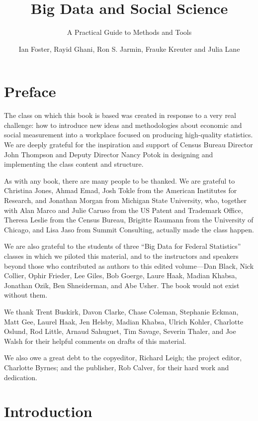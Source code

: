 \documentclass[]{krantz}
\title{Big Data and Social Science}
\subtitle{A Practical Guide to Methods and Tools}
\author{Ian Foster, Rayid Ghani, Ron S. Jarmin, Frauke Kreuter and Julia Lane}
\date{}
\begin{document}
\maketitle

{
\setcounter{tocdepth}{1}
\tableofcontents
}
\listoftables
\listoffigures
\chapter*{Preface}\label{preface}

The class on which this book is based was created in response to a very
real challenge: how to introduce new ideas and methodologies about
economic and social measurement into a workplace focused on producing
high-quality statistics. We are deeply grateful for the inspiration and
support of Census Bureau Director John Thompson and Deputy Director
Nancy Potok in designing and implementing the class content and
structure.

As with any book, there are many people to be thanked. We are grateful
to Christina Jones, Ahmad Emad, Josh Tokle from the American Institutes
for Research, and Jonathan Morgan from Michigan State University, who,
together with Alan Marco and Julie Caruso from the US Patent and
Trademark Office, Theresa Leslie from the Census Bureau, Brigitte
Raumann from the University of Chicago, and Lisa Jaso from Summit
Consulting, actually made the class happen.

We are also grateful to the students of three ``Big Data for Federal
Statistics'' classes in which we piloted this material, and to the
instructors and speakers beyond those who contributed as authors to this
edited volume---Dan Black, Nick Collier, Ophir Frieder, Lee Giles, Bob
Goerge, Laure Haak, Madian Khabsa, Jonathan Ozik, Ben Shneiderman, and
Abe Usher. The book would not exist without them.

We thank Trent Buskirk, Davon Clarke, Chase Coleman, Stephanie Eckman,
Matt Gee, Laurel Haak, Jen Helsby, Madian Khabsa, Ulrich Kohler,
Charlotte Oslund, Rod Little, Arnaud Sahuguet, Tim Savage, Severin
Thaler, and Joe Walsh for their helpful comments on drafts of this
material.

We also owe a great debt to the copyeditor, Richard Leigh; the project
editor, Charlotte Byrnes; and the publisher, Rob Calver, for their hard
work and dedication.

\hypertarget{chap:intro}{\chapter{Introduction}\label{chap:intro}}
\end{document}
